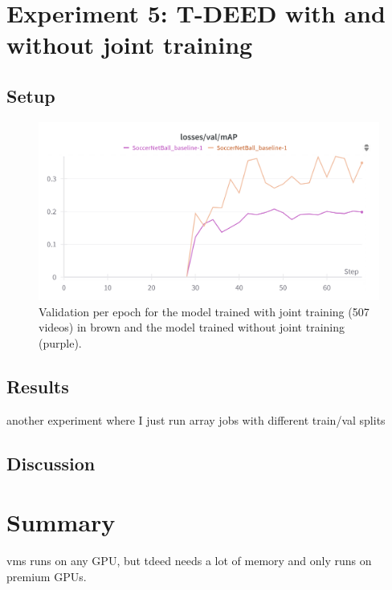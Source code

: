 \section{Experiment 5: T-DEED with and without joint training}
\subsection{Setup}
\label{ssec:ex5_setup}
\begin{figure}
    \centering
    \includegraphics[width=0.75\linewidth]{figures/500_7_val_compare.png}
    \caption{Validation per epoch for the model trained with joint training (507 videos) in brown and the model trained without joint training (purple).}
    \label{fig:500_7_val_compare}
\end{figure}
\subsection{Results}
\label{ssec:ex5_results}


another experiment where I just run array jobs with different train/val splits

\subsection{Discussion}
\label{ssec:ex5_discussion}


\section{Summary}
vms runs on any GPU, but tdeed needs a lot of memory and only runs on premium GPUs.